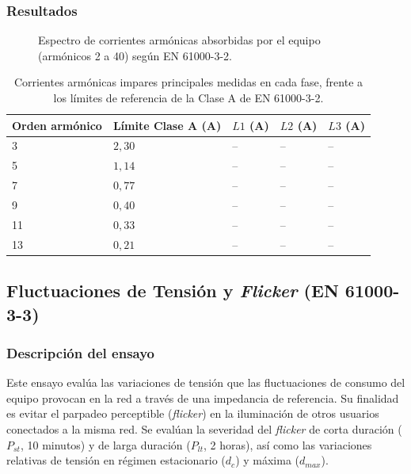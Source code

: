 \subsubsection*{Resultados}

\begin{figure}[htbp]
    \centering
    \caption{Espectro de corrientes armónicas absorbidas por el equipo (armónicos 2 a 40) según EN 61000-3-2.}
    \label{fig:armonicos_corriente}
\end{figure}

\begin{table}[!h]
\centering
\small
\begin{tabular}{|p{2.4cm}|p{3.2cm}|p{2.2cm}|p{2.2cm}|p{2.2cm}|}
\hline
\textbf{Orden armónico} & \textbf{Límite Clase A (A)} & \textbf{$L1$ (A)} & \textbf{$L2$ (A)} & \textbf{$L3$ (A)} \\ \hline
3 & $2,30$ & -- & -- & -- \\ \hline
5 & $1,14$ & -- & -- & -- \\ \hline
7 & $0,77$ & -- & -- & -- \\ \hline
9 & $0,40$ & -- & -- & -- \\ \hline
11 & $0,33$ & -- & -- & -- \\ \hline
13 & $0,21$ & -- & -- & -- \\ \hline
\end{tabular}
\caption{Corrientes armónicas impares principales medidas en cada fase, frente a los límites de referencia de la Clase A de EN 61000-3-2.}
\label{tab:resultados_armonicos}
\end{table}

\subsection{Fluctuaciones de Tensión y \textit{Flicker} (EN 61000-3-3)}
\label{subsec:flicker}

\subsubsection*{Descripción del ensayo}

Este ensayo evalúa las variaciones de tensión que las fluctuaciones de consumo del equipo provocan en la red a través de una impedancia de referencia. Su finalidad es evitar el parpadeo perceptible (\textit{flicker}) en la iluminación de otros usuarios conectados a la misma red. Se evalúan la severidad del \textit{flicker} de corta duración ($P_{st}$, 10 minutos) y de larga duración ($P_{lt}$, 2 horas), así como las variaciones relativas de tensión en régimen estacionario ($d_c$) y máxima ($d_{max}$).

